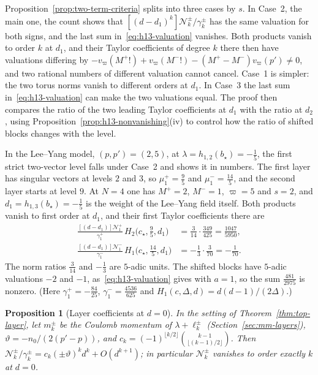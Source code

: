 \documentclass[twoside,10pt]{article}
\numberwithin{equation}{section}
\theoremstyle{slbody}
\newtheorem{proposition}[theorem]{Proposition}
\theoremstyle{definition}
\theoremstyle{remark}
\begin{document}
Proposition~\ref{prop:two-term-criteria} splits into three cases by \(s\).  In
Case~2, the main one, the count shows that
\([(d-d_1)^k]\mathcal N^\pm_k/\gamma^\pm_k\) has the same valuation for both
signs, and the last sum in~\eqref{eq:h13-valuation} vanishes.  Both products
vanish to order \(k\) at \(d_1\), and their Taylor coefficients of degree \(k\)
there then have valuations differing by
\(-v_\varpi(M^+!)+v_\varpi(M^-!)-(M^+-M^-)v_\varpi(p')\neq0\), and two rational numbers
of different valuation cannot cancel.  Case~1 is simpler: the two torus norms
vanish to different orders at \(d_1\).  In Case~3 the last sum
in~\eqref{eq:h13-valuation} can make the two valuations equal.  The proof then
compares the ratio of the two leading Taylor coefficients at \(d_1\) with the
ratio at \(d_2\), using Proposition~\ref{prop:h13-nonvanishing}(iv) to control
how the ratio of shifted blocks changes with the level.

In the Lee--Yang model, \((p,p')=(2,5)\), at
\(\lambda=h_{1,2}(b_\star)=-\frac15\), the first strict two-vector level
falls under Case~2 and shows it in numbers.  The first
layer has singular vectors at levels \(2\) and \(3\), so
\(\mu^+_1=\frac95\) and \(\mu^-_1=\frac{14}5\), and the second layer starts at
level \(9\).  At \(N=4\) one has \(M^+=2\), \(M^-=1\), \(\varpi=5\) and
\(s=2\), and \(d_1=h_{1,3}(b_\star)=-\frac15\) is the weight of the Lee--Yang
field itself.  Both products vanish to first order at \(d_1\), and their first
Taylor coefficients there are
\begin{align*}
 \frac{[(d-d_1)]\mathcal N^+_1}{\gamma^+_1}\,H_2\bigl(c_\star,\tfrac95,d_1\bigr)
 &=\frac3{14}\cdot\frac{349}{425}=\frac{1047}{5950},\\
 \frac{[(d-d_1)]\mathcal N^-_1}{\gamma^-_1}\,H_1\bigl(c_\star,\tfrac{14}5,d_1\bigr)
 &=-\frac13\cdot\frac3{70}=-\frac1{70}.
\end{align*}
The norm ratios \(\frac3{14}\) and \(-\frac13\) are \(5\)-adic units.  The
shifted blocks have \(5\)-adic valuations \(-2\) and \(-1\),
as~\eqref{eq:h13-valuation} gives with \(a=1\), so the sum
\(\frac{481}{2975}\) is nonzero.  (Here \(\gamma^+_1=-\frac{84}{25}\),
\(\gamma^-_1=\frac{4536}{625}\) and \(H_1(c,\Delta,d)=d(d-1)/(2\Delta)\).)

\begin{proposition}[Layer coefficients at \(d=0\)]
\label{prop:layer-coefficients}
In the setting of Theorem~\ref{thm:top-layer}, let \(m^\pm_k\) be the
Coulomb momentum of \(\lambda+\ell^\pm_k\) (Section~\ref{sec:mm-layers}),
\(\vartheta=-n_0/(2(p'-p))\), and
\(c_k=(-1)^{\lfloor k/2\rfloor}\binom{k-1}{\lfloor(k-1)/2\rfloor}\).  Then
\(\mathcal N^\pm_k/\gamma^\pm_k=c_k(\pm\vartheta)^kd^k+O(d^{k+1})\); in particular
\(\mathcal N^\pm_k\) vanishes to order exactly \(k\) at \(d=0\).
\end{proposition}
\end{document}
